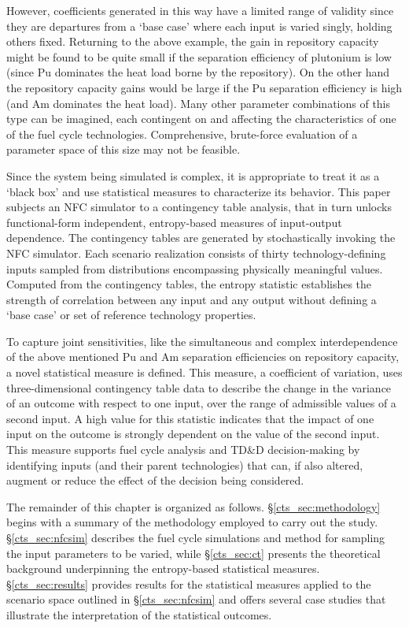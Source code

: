 However, coefficients generated in this way have a limited range of validity since they are departures from a
`base case' where each input is varied singly, holding others fixed.  Returning to the above example,
the gain in repository capacity might be found to be quite small if the separation efficiency
of plutonium is low (since Pu dominates the heat load borne by the repository). 
On the other hand the repository capacity gains would be large
if the Pu separation efficiency is high (and Am dominates the heat load).  Many other
parameter combinations of this type can be imagined, each contingent on and affecting 
the characteristics of one of the fuel cycle technologies.  Comprehensive,
brute-force evaluation of a parameter space of this size may not be feasible.

Since the system being simulated is complex, it is appropriate to treat it as a `black box'
and use statistical measures to characterize its behavior.  This paper subjects an NFC simulator
to a contingency table analysis, that in turn unlocks functional-form independent, entropy-based
measures of input-output dependence.  The contingency tables are generated by stochastically invoking
the NFC simulator. Each scenario realization consists of thirty technology-defining inputs sampled
from distributions encompassing physically meaningful values.  Computed from the contingency tables,
the entropy statistic establishes the strength of correlation between any input and any output
without defining a `base case' or set of reference technology properties.

To capture joint sensitivities, like the simultaneous and complex interdependence of the
above mentioned Pu and Am separation efficiencies on repository capacity, a novel statistical
measure is defined.  This measure, a coefficient of variation, uses three-dimensional contingency
table data to describe the change in the variance of an outcome with respect to one input, over the
range of admissible values of a second input.  A high value for this statistic indicates that the
impact of one input on the outcome is strongly dependent on the value of the second input.  This
measure supports fuel cycle analysis and TD\&D decision-making by identifying inputs (and their
parent technologies) that can, if also altered, augment or reduce the effect of the decision
being considered.

The remainder of this chapter is organized as follows.  \S \ref{cts_sec:methodology} begins 
with a summary of the methodology employed to carry out the study.  \S \ref{cts_sec:nfcsim} describes the 
fuel cycle simulations and method for sampling the input parameters to be varied, 
while \S \ref{cts_sec:ct} presents the theoretical background underpinning the entropy-based
statistical measures.  \S \ref{cts_sec:results} provides results for the statistical measures 
applied to the scenario space outlined in \S \ref{cts_sec:nfcsim} and offers several case 
studies that illustrate the interpretation of the statistical outcomes.

